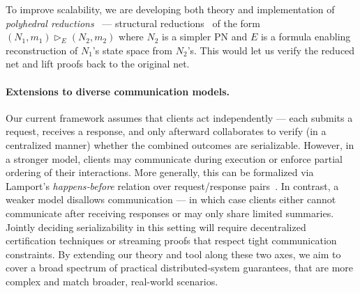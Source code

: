 To improve scalability, we are developing both theory and implementation of \textit{polyhedral reductions}~\cite{AmBeDa21} --- structural reductions~\cite{Be87,BeLeDa20} of the form $(N_1, m_1) \vartriangleright_E (N_2, m_2)$ where $N_2$ is a simpler PN and $E$ is a formula enabling reconstruction of $N_1$'s state space from $N_2$'s. This would let us verify the reduced net and lift proofs back to the original net.
%
%
%
%


\paragraph{Extensions to diverse communication models.}

Our current framework assumes that clients act independently --- each submits a request, receives a response, and only afterward collaborates to verify (in a centralized manner) whether the combined outcomes are serializable. However, in a stronger model, clients may communicate during execution or enforce partial ordering of their interactions. More generally, this can be formalized via Lamport’s \textit{happens‐before} relation over request/response pairs~\cite{La78}. 
%
In contrast, a weaker model disallows communication --- in which case clients either cannot communicate after receiving responses or may only share limited summaries. Jointly deciding serializability in this setting will require decentralized certification techniques or streaming proofs that respect tight communication constraints. 
%
By extending our theory and tool along these two axes, we aim to cover a broad spectrum of practical distributed‐system guarantees, that are more complex and match broader, real-world scenarios.

%
%
%
